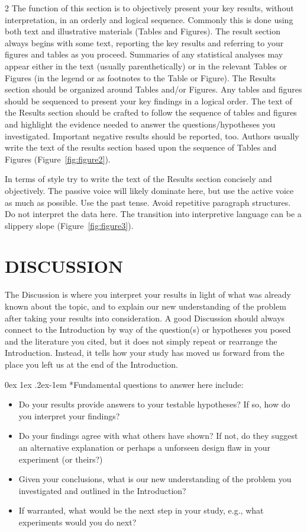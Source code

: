 \documentclass[a4paper,10pt]{article}
\makeatletter
\renewcommand{\paragraph}{%
  \@startsection{paragraph}{4}%
  {\z@}{0ex \@plus 1ex \@minus .2ex}{-1em}%
  {\normalfont\normalsize\bfseries}%
}
\makeatother
\begin{document}
\begin{multicols}{2}
The function of this section is to objectively present your key results, without interpretation, in an orderly and logical sequence. Commonly this is done using both text and illustrative materials (Tables and Figures). The result section always begins with some text, reporting the key results and referring to your figures and tables as you proceed. Summaries of any statistical analyses may appear either in the text (usually parenthetically) or in the relevant Tables or Figures (in the legend or as footnotes to the Table or Figure). The Results section should be organized around Tables and/or Figures. Any tables and figures should be sequenced to present your key findings in a logical order. The text of the Results section should be crafted to follow the sequence of tables and figures and highlight the evidence needed to answer the questions/hypotheses you investigated. Important negative results should be reported, too. Authors usually write the text of the results section based upon the sequence of Tables and Figures (Figure~\ref{fig:figure2}).

In terms of style try to write the text of the Results section concisely and objectively. The passive voice will likely dominate here, but use the active voice as much as possible. Use the past tense. Avoid repetitive paragraph structures. Do not interpret the data here. The transition into interpretive language can be a slippery slope (Figure~\ref{fig:figure3}).

\section*{DISCUSSION}
The Discussion is where you interpret your results in light of what was already known about the topic, and to explain our new understanding of the problem after taking your results into consideration. A good Discussion should always connect to the Introduction by way of the question(s) or hypotheses you posed and the literature you cited, but it does not simply repeat or rearrange the Introduction. Instead, it tells how your study has moved us forward from the place you left us at the end of the Introduction.

\paragraph*{Fundamental questions to answer here include:}
\begin{itemize}
    \item Do your results provide answers to your testable hypotheses? If so, how do you interpret your findings?
    \item Do your findings agree with what others have shown? If not, do they suggest an alternative explanation or perhaps a unforseen design flaw in your experiment (or theirs?)
    \item Given your conclusions, what is our new understanding of the problem you investigated and outlined in the Introduction?
    \item If warranted, what would be the next step in your study, e.g., what experiments would you do next?
\end{itemize}


\end{multicols}
\end{document}
